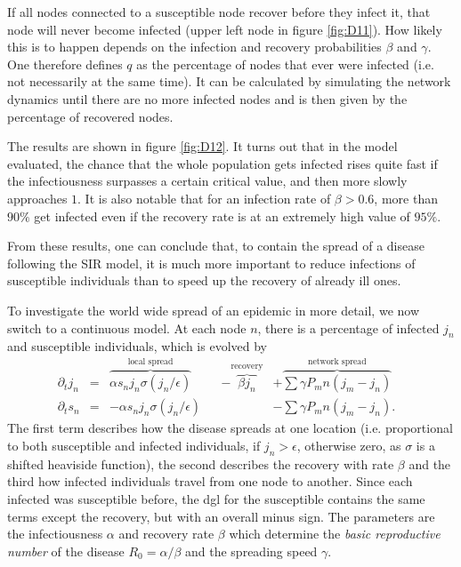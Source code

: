 \documentclass{scrartcl}
\begin{document}
If all nodes connected to a susceptible node recover before they infect it, that node will never become infected (upper left node in figure \ref{fig:D11}). How likely this is to happen depends on the infection and recovery probabilities $\beta$ and $\gamma$. 
One therefore defines $q$ as the percentage of nodes that ever were infected (i.e. not necessarily at the same time). 
It can be calculated by simulating the network dynamics until there are no more infected nodes and is then given by the percentage of recovered nodes. 

The results are shown in figure \ref{fig:D12}. 
It turns out that in the model evaluated, the chance that the whole 
population gets infected rises quite fast if the infectiousness surpasses
a certain critical value, and then more slowly approaches $1$. It is also 
notable that for an infection rate of $\beta > 0.6$, more than $90\%$ get infected even if
the recovery rate is at an extremely high value of $95\%$.

From these results, one can conclude that, to contain the spread of a disease following the SIR model, 
it is much more important to reduce infections of susceptible individuals than to speed up the recovery of already ill ones.

To investigate the world wide spread of an epidemic in more detail, we now switch to a continuous model. At each node $n$, there is a percentage of infected $j_n$ and susceptible individuals, which is evolved by
\begin{align}
\partial_t j_n &=& \overbrace{\alpha s_n j_n \sigma( j_n / \epsilon)}^{\text{local spread}} &&- \overbrace{\beta j_n}^{\text{recovery}} &+ \overbrace{\sum{\gamma P_mn (j_m - j_n)}}^{\text{network spread}}&\\
\partial_t s_n &=& -\alpha s_n j_n \sigma( j_n / \epsilon)&  &&- \sum{\gamma P_mn (j_m - j_n)}.&
\end{align}
The first term describes how the disease spreads at one location (i.e. proportional to both susceptible and infected individuals, if $j_n > \epsilon$, otherwise zero, as $\sigma$ is a shifted heaviside function), the second describes the recovery with rate $\beta$ and the third how infected individuals travel from one node to another. Since each infected was susceptible before, the dgl for the susceptible contains the same terms except the recovery, but with an overall minus sign. The parameters are the infectiousness $\alpha$ and recovery rate $\beta$ which determine the \emph{basic reproductive number} of the disease $R_0= \alpha / \beta$ and the spreading speed $\gamma$. 
\end{document}
